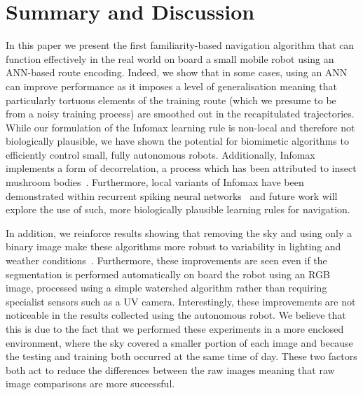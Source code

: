 \documentclass[letterpaper]{article}
\begin{document}
\section{Summary and Discussion}
In this paper we present the first familiarity-based navigation algorithm that can function effectively in the real world on board a small mobile robot using an ANN-based route encoding. 
Indeed, we show that in some cases, using an ANN can improve performance as it imposes a level of generalisation meaning that particularly tortuous elements of the training route (which we presume to be from a noisy training process) are smoothed out in the recapitulated trajectories.
While our formulation of the Infomax learning rule is non-local and therefore not biologically plausible, we have shown the potential for biomimetic algorithms to efficiently control small, fully autonomous robots. 
Additionally, Infomax implements a form of decorrelation,  a process which has been attributed to insect mushroom bodies~\citep{Hige2015,Nowotny2005}.
Furthermore, local variants of Infomax have been demonstrated within recurrent spiking neural networks~\citep{Hayakawa2014} and future work will explore the use of such, more biologically plausible learning rules for navigation.

In addition, we reinforce results showing that removing the sky and using only a binary image make these algorithms more robust to variability in lighting and weather conditions~\citep{Philippides2011,Stone2014}. 
Furthermore, these improvements are seen even if the segmentation is performed automatically on board the robot using an RGB image, processed using a simple watershed algorithm rather than requiring specialist sensors such as a UV camera.
Interestingly, these improvements are not noticeable in the results collected using the autonomous robot.
We believe that this is due to the fact that we performed these experiments in a more enclosed environment, where the sky covered a smaller portion of each image and because the testing and training both occurred at the same time of day.
These two factors both act to reduce the differences between the raw images meaning that raw image comparisons are more successful.
\end{document}
